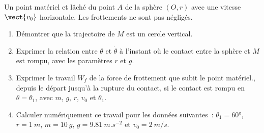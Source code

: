 %
\begin{exercice}
  Un point matériel et lâché du point $A$ de la sphère $(O, r)$ avec une vitesse $\vect{v_0}$ horizontale. Les frottements ne sont pas négligés.
  \begin{enumerate}
  \item Démontrer que la trajectoire de $M$ est un cercle vertical.
  \item Exprimer la relation entre $\theta$ et $\dot{\theta}$ à l'instant où le contact entre la sphère et $M$ est rompu, avec les paramètres $r$ et $g$.
  \item Exprimer le travail $W_f$ de la force de frottement que subit le point matériel., depuis le départ jusqu'à la rupture du contact, si le contact est rompu en $\theta=\theta_1$, avec $m$, $g$, $r$, $v_0$ et $\theta_1$.
  \item Calculer numériquement ce travail pour les données suivantes~: $\theta_1=60°$, $r=\SI{1}{m}$, $m=\SI{10}{g}$, $g=\SI{9,81}{m.s^{-2}}$ et $v_0=\SI{2}{m/s}$.
  \end{enumerate}

\end{exercice}
